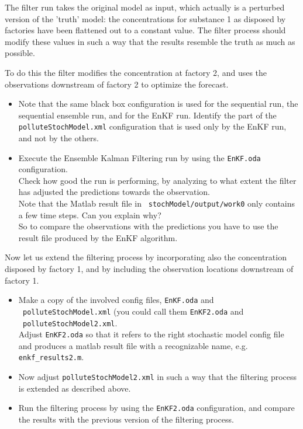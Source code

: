 The filter run takes the original model as input, which actually is a perturbed
version of the 'truth' model: the concentrations for substance 1 as disposed by
factories have been flattened out to a constant value. The filter process
should modify these values in such a way that the results resemble the truth as
much as possible.

To do this the filter modifies the concentration at factory 2, and uses the
observations downstream of factory 2 to optimize the forecast.

\begin{itemize}
 \item Note that the same black box configuration is used for the sequential
   run, the sequential ensemble run, and for the EnKF run. Identify the part of
   the {\tt polluteStochModel.xml} configuration that is used only by the EnKF
   run, and not by the others.
 \item Execute the Ensemble Kalman Filtering run by using the {\tt EnKF.oda}
   configuration.\\ Check how good the run is performing, by analyzing to what
   extent the filter has adjusted the predictions towards the
   observation.\\ Note that the Matlab result file in {\tt
     stochModel/output/work0} only contains a few time steps. Can you explain
   why?\\ So to compare the observations with the predictions you have to use
   the result file produced by the EnKF algorithm.
\end{itemize}

Now let us extend the filtering process by incorporating also the concentration
disposed by factory 1, and by including the observation locations downstream of
factory 1.

\begin{itemize}
 \item Make a copy of the involved config files, {\tt EnKF.oda} and \\{\tt
   polluteStochModel.xml} (you could call them {\tt EnKF2.oda} and\\ {\tt
   polluteStochModel2.xml}.\\ Adjust {\tt EnKF2.oda} so that it refers to the
   right stochastic model config file and produces a matlab result file with a
   recognizable name, e.g. {\tt enkf\_results2.m}.
 \item Now adjust {\tt polluteStochModel2.xml} in such a way that the filtering
   process is extended as described above.
 \item Run the filtering process by using the {\tt EnKF2.oda} configuration,
   and compare the results with the previous version of the filtering process.
\end{itemize}

